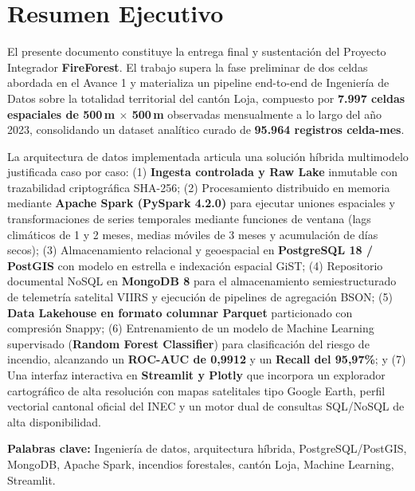\documentclass[11pt,a4paper]{article}
\begin{document}
\section*{Resumen Ejecutivo}

El presente documento constituye la entrega final y sustentaci\'on del Proyecto Integrador \textbf{FireForest}. El trabajo supera la fase preliminar de dos celdas abordada en el Avance 1 y materializa un pipeline end-to-end de Ingenier\'ia de Datos sobre la totalidad territorial del cant\'on Loja, compuesto por \textbf{7.997 celdas espaciales de 500\,m $\times$ 500\,m} observadas mensualmente a lo largo del a\~no 2023, consolidando un dataset anal\'itico curado de \textbf{95.964 registros celda-mes}.

La arquitectura de datos implementada articula una soluci\'on h\'ibrida multimodelo justificada caso por caso: (1) \textbf{Ingesta controlada y Raw Lake} inmutable con trazabilidad criptogr\'afica SHA-256; (2) Procesamiento distribuido en memoria mediante \textbf{Apache Spark (PySpark 4.2.0)} para ejecutar uniones espaciales y transformaciones de series temporales mediante funciones de ventana (lags clim\'aticos de 1 y 2 meses, medias m\'oviles de 3 meses y acumulaci\'on de d\'ias secos); (3) Almacenamiento relacional y geoespacial en \textbf{PostgreSQL 18 / PostGIS} con modelo en estrella e indexaci\'on espacial GiST; (4) Repositorio documental NoSQL en \textbf{MongoDB 8} para el almacenamiento semiestructurado de telemetr\'ia satelital VIIRS y ejecuci\'on de pipelines de agregaci\'on BSON; (5) \textbf{Data Lakehouse en formato columnar Parquet} particionado con compresi\'on Snappy; (6) Entrenamiento de un modelo de Machine Learning supervisado (\textbf{Random Forest Classifier}) para clasificaci\'on del riesgo de incendio, alcanzando un \textbf{ROC-AUC de 0,9912} y un \textbf{Recall del 95,97\%}; y (7) Una interfaz interactiva en \textbf{Streamlit y Plotly} que incorpora un explorador cartogr\'afico de alta resoluci\'on con mapas satelitales tipo Google Earth, perfil vectorial cantonal oficial del INEC y un motor dual de consultas SQL/NoSQL de alta disponibilidad.

\vspace{0.4cm}
\noindent\textbf{Palabras clave:} Ingenier\'ia de datos, arquitectura h\'ibrida, PostgreSQL/PostGIS, MongoDB, Apache Spark, incendios forestales, cant\'on Loja, Machine Learning, Streamlit.
\end{document}
